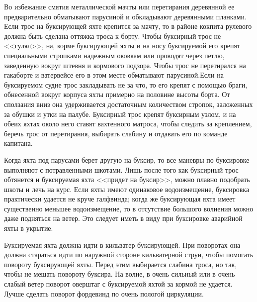 \documentclass[a4paper, 12pt, twoside, final, book, russian, fittopage, cyremdash]{ncc}
\begin{document}
Во избежание смятия металлической мачты или перетирания деревянной ее предварительно обматывают парусиной и обкладывают деревянными планками. Если трос на буксирующей яхте крепится за мачту, то в районе кокпита рулевого должна быть сделана оттяжка троса к борту. Чтобы буксирный трос не <<гулял>>, на, корме буксирующей яхты и на носу буксируемой его крепят специальными стропками надежным оковкам или проводят через петлю, заведенную вокруг штевня и кормового подзора. Чтобы трос не перетирался на гакаборте и ватервейсе его в этом месте обматывают парусиной.Если на буксируемом судне трос закладывать не за что, то его крепят с помощью браги, обнесенной вокруг корпуса яхты примерно на половине высоты борта. От сползания вниз она удерживается достаточным количеством стропок, заложенных за обушки и утки на палубе. Буксирный трос крепят буксирным узлом, и на обеих яхтах около него ставят вахтенного матроса, чтобы следить за креплением, беречь трос от перетирания, выбирать слабину и отдавать его по команде капитана.

Когда яхта под парусами берет другую на буксир, то все маневры по буксировке выполняют с потравленными шкотами. Лишь после того как буксирный трос обтянется и буксируемая яхта <<придет на буксир>>, можно плавно подобрать шкоты и лечь на курс. Если яхты имеют одинаковое водоизмещение, буксировка практически удается не круче галфвинда; когда же буксирующая яхта имеет существенно меньшее водоизмещение, то в отсутствие большого волнения можно даже подняться на ветер. Это следует иметь в виду при буксировке аварийной яхты в укрытие.

Буксируемая яхта должна идти в кильватер буксирующей. При поворотах она должна стараться идти по наружной стороне кильватерной струи, чтобы помогать повороту буксирующей яхты. Перед этим выбирается слабина троса, но так, чтобы не мешать повороту буксира. На волне, в очень сильный или в очень слабый ветер поворот оверштаг с буксируемой яхтой за кормой не удается. Лучше сделать поворот фордевинд по очень пологой циркуляции.
\end{document}

